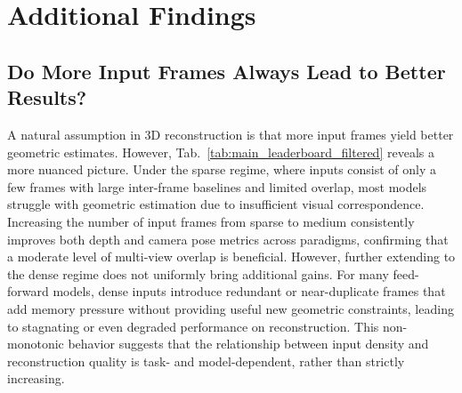 \section{Additional Findings}
\label{appendix:other_findings}


\subsection{Do More Input Frames Always Lead to Better Results?}
A natural assumption in 3D reconstruction is that more input frames yield better geometric estimates. 
%
However, Tab.~\ref{tab:main_leaderboard_filtered} reveals a more nuanced picture.
%
Under the sparse regime, where inputs consist of only a few frames with large inter-frame baselines and limited overlap, most models struggle with geometric estimation due to insufficient visual correspondence.
%
Increasing the number of input frames from sparse to medium consistently improves both depth and camera pose metrics across paradigms, confirming that a moderate level of multi-view overlap is beneficial.
%
However, further extending to the dense regime does not uniformly bring additional gains. 
%
For many feed-forward models, dense inputs introduce redundant or near-duplicate frames that add memory pressure without providing useful new geometric constraints, leading to stagnating or even degraded performance on reconstruction.
%
This non-monotonic behavior suggests that the relationship between input density and reconstruction quality is task- and model-dependent, rather than strictly increasing.
%

